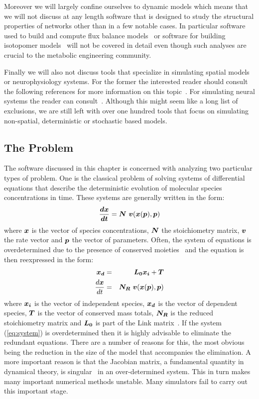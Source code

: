 \documentclass[12pt]{article}
\newcommand{\bT}{\mbox{\boldmath $T$}}
\newcommand{\bN}{\mbox{\boldmath $N$}}
\newcommand{\bp}{\mbox{\boldmath $p$}}
\newcommand{\bx}{\mbox{\boldmath $x$}}
\newcommand{\bLo}{\mbox{\boldmath $L_0$}}
\newcommand{\bNr}{\mbox{\boldmath $N_R$}}
\newcommand{\bdx}{\mbox{\boldmath $dx$}}
\newcommand{\bxi}{\mbox{\boldmath $x_i$}}
\newcommand{\bxd}{\mbox{\boldmath $x_d$}}
\newcommand{\bdt}{\mbox{\boldmath $dt$}}
\newcommand{\bv}{\mbox{\boldmath $v$}}
\begin{document}
Moreover we will largely confine ourselves to dynamic models which means that we will not discuss at any length software that is designed to study the structural properties of networks other than in a few notable cases. In particular software used to build and compute flux balance models~\citep{FSm86a,Kauffman:2003,Papin:2006,PalssonBook:2007} or software for building isotopomer models~\citep{Wiechert:2001,Schwender:2008} will not be covered in detail even though such analyses are crucial to the metabolic engineering community.

Finally we will also not discuss tools that specialize in simulating spatial models or neurophysiology systems. For the former the interested reader should consult the following references for more information on this topic~\citep{ECELL,Ander:2004,Broderick:2005,Hattne:2005,Coggan:2005,Lemerle:2005,Sanford:2006}.
For simulating neural systems the reader can consult~\citep{Neuron:1993,NeuronBook:2006,Genesis:1998,kinetikit:2002}.
Although this might seem like a long list of exclusions, we are
still left with over one hundred tools that focus on simulating
non-spatial, deterministic or stochastic based models.

\subsection{The Problem}

The software discussed in this chapter is concerned with
analyzing two particular types of problem. One is the classical
problem of solving systems of differential equations that describe the deterministic
evolution of molecular species concentrations in time. These systems
are generally written in the form:
%
\begin{equation}
\frac{\bdx}{\bdt} = \bN\ \bv (\bx (\bp), \bp) \label{eq:system}
\end{equation}
%
where $\bx$ is the vector of species concentrations, $\bN$ the
stoichiometry matrix, $\bv$ the rate vector and $\bp$ the vector of
parameters. Often, the system of equations is overdetermined due to
the presence of conserved moieties~\cite{Re81} and the equation is then
reexpressed in the form:
%
{ \addtolength{\jot}{6pt}
\begin{eqnarray}
  \bxd &=& \bLo \bxi + \bT \nonumber \\
  \frac{d\bx}{dt} &=& \bNr\ \bv (\bx (\bp), \bp) \label{eq:general}
\end{eqnarray} }
%
where $\bxi$ is the vector of independent species, $\bxd$ is the
vector of dependent species, $\bT$ is the vector of conserved mass
totals, $\bNr$ is the reduced stoichiometry matrix and $\bLo$ is
part of the Link matrix~\citep{Re88a,SauroIngalls:2004}. If the
system (\ref{eq:system}) is overdetermined then it is highly
advisable to eliminate the redundant equations. There are a number
of reasons for this, the most obvious being the reduction in the
size of the model that accompanies the elimination. A more important
reason is that the Jacobian matrix, a fundamental quantity in
dynamical theory, is singular~\citep{Ravi:2006} in an over-determined
system. This in turn makes many important numerical methods
unstable. Many simulators fail to carry out this important stage.
\end{document}

